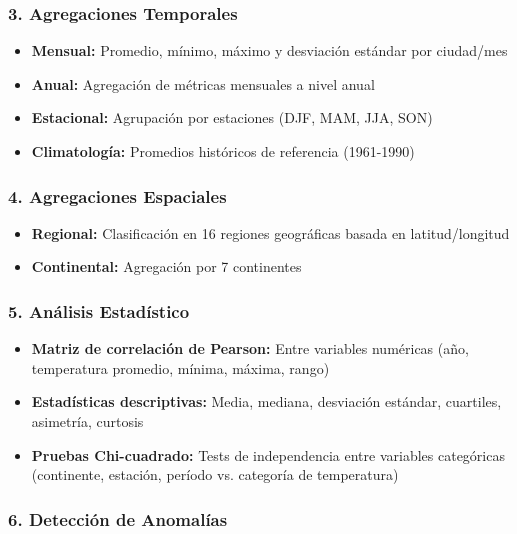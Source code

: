 \documentclass[12pt,a4paper]{scrartcl}
\begin{document}
\subsubsection{3. Agregaciones Temporales}

\begin{itemize}
    \item \textbf{Mensual:} Promedio, mínimo, máximo y desviación estándar por ciudad/mes
    \item \textbf{Anual:} Agregación de métricas mensuales a nivel anual
    \item \textbf{Estacional:} Agrupación por estaciones (DJF, MAM, JJA, SON)
    \item \textbf{Climatología:} Promedios históricos de referencia (1961-1990)
\end{itemize}

\subsubsection{4. Agregaciones Espaciales}

\begin{itemize}
    \item \textbf{Regional:} Clasificación en 16 regiones geográficas basada en latitud/longitud
    \item \textbf{Continental:} Agregación por 7 continentes
\end{itemize}

\subsubsection{5. Análisis Estadístico}

\begin{itemize}
    \item \textbf{Matriz de correlación de Pearson:} Entre variables numéricas (año, temperatura promedio, mínima, máxima, rango)
    \item \textbf{Estadísticas descriptivas:} Media, mediana, desviación estándar, cuartiles, asimetría, curtosis
    \item \textbf{Pruebas Chi-cuadrado:} Tests de independencia entre variables categóricas (continente, estación, período vs. categoría de temperatura)
\end{itemize}

\subsubsection{6. Detección de Anomalías}
\end{document}
